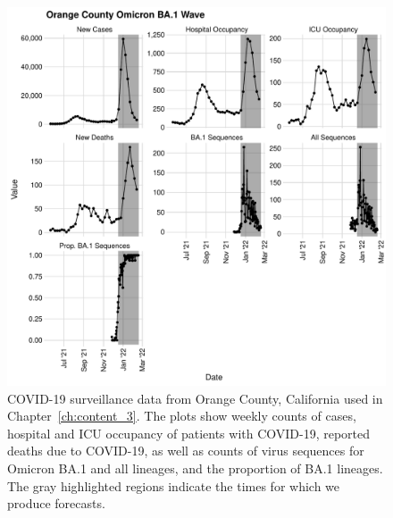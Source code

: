 \begin{figure}
    \centering
    \includegraphics[width=1.0\columnwidth]{figures/ch_5/orange_county_binned_data_plot.pdf}
    \caption[COVID-19 surveillance data from Orange County, California used in Chapter~\ref{ch:content_3}.]{
COVID-19 surveillance data from Orange County, California used in Chapter~\ref{ch:content_3}.
The plots show weekly counts of cases, hospital and ICU occupancy of patients with COVID-19, reported deaths due to COVID-19, as well as counts of virus sequences for Omicron BA.1 and all lineages, and the proportion of BA.1 lineages.
The gray highlighted regions indicate the times for which we produce forecasts.}
    \label{ch_1:fig:orange_county_binned_data_plot}
\end{figure}

